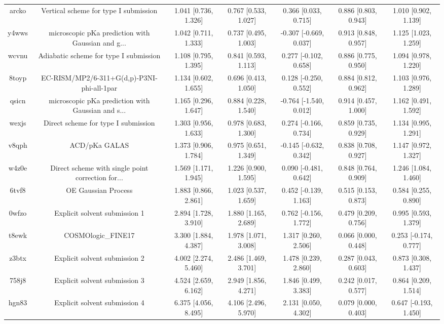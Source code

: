 \documentclass{article}
\begin{document}
\begin{center}
\begin{longtable}{|ccccccc|}
 arcko &              Vertical scheme for type I submission &  1.041 [0.736, 1.326] &  0.767 [0.533, 1.027] &     0.366 [0.033, 0.715] &  0.886 [0.803, 0.943] &   1.010 [0.902, 1.139] \\
 y4wws &  microscopic pKa prediction with Gaussian and g... &  1.042 [0.711, 1.333] &  0.737 [0.495, 1.003] &   -0.307 [-0.669, 0.037] &  0.913 [0.848, 0.957] &   1.125 [1.023, 1.259] \\
 wcvnu &             Adiabatic scheme for type I submission &  1.108 [0.795, 1.395] &  0.841 [0.593, 1.113] &    0.277 [-0.102, 0.658] &  0.886 [0.775, 0.950] &   1.094 [0.978, 1.220] \\
 8toyp &         EC-RISM/MP2/6-311+G(d,p)-P3NI-phi-all-1par &  1.134 [0.602, 1.655] &  0.696 [0.413, 1.050] &    0.128 [-0.250, 0.552] &  0.884 [0.812, 0.962] &   1.103 [0.976, 1.289] \\
 qsicn &  microscopic pKa prediction with Gaussian and s... &  1.165 [0.296, 1.647] &  0.884 [0.228, 1.540] &   -0.764 [-1.540, 0.012] &  0.914 [0.457, 1.000] &   1.162 [0.491, 1.592] \\
 wexjs &                Direct scheme for type I submission &  1.303 [0.956, 1.633] &  0.978 [0.683, 1.300] &    0.274 [-0.166, 0.734] &  0.859 [0.735, 0.929] &   1.134 [0.995, 1.291] \\
 v8qph &                                      ACD/pKa GALAS &  1.373 [0.906, 1.784] &  0.975 [0.651, 1.349] &   -0.145 [-0.632, 0.342] &  0.838 [0.708, 0.927] &   1.147 [0.972, 1.327] \\
 w4z0e &  Direct scheme with single point correction for... &  1.569 [1.171, 1.945] &  1.226 [0.900, 1.595] &    0.090 [-0.481, 0.642] &  0.848 [0.764, 0.909] &   1.246 [1.084, 1.460] \\
 6tvf8 &                                OE Gaussian Process &  1.883 [0.866, 2.861] &  1.023 [0.537, 1.659] &    0.452 [-0.139, 1.163] &  0.515 [0.153, 0.873] &   0.584 [0.255, 0.890] \\
 0wfzo &                      Explicit solvent submission 1 &  2.894 [1.728, 3.910] &  1.880 [1.165, 2.689] &    0.762 [-0.156, 1.772] &  0.479 [0.209, 0.756] &   0.995 [0.593, 1.379] \\
 t8ewk &                                 COSMOlogic\_FINE17 &  3.300 [1.884, 4.387] &  1.978 [1.071, 3.008] &     1.317 [0.260, 2.506] &  0.066 [0.000, 0.448] &  0.253 [-0.174, 0.777] \\
 z3btx &                      Explicit solvent submission 2 &  4.002 [2.274, 5.460] &  2.486 [1.469, 3.701] &     1.478 [0.239, 2.860] &  0.287 [0.043, 0.603] &   0.873 [0.308, 1.437] \\
 758j8 &                      Explicit solvent submission 3 &  4.524 [2.659, 6.162] &  2.949 [1.856, 4.271] &     1.846 [0.499, 3.383] &  0.242 [0.017, 0.577] &   0.864 [0.209, 1.514] \\
 hgn83 &                      Explicit solvent submission 4 &  6.375 [4.056, 8.495] &  4.106 [2.496, 5.970] &     2.131 [0.050, 4.302] &  0.079 [0.000, 0.403] &  0.647 [-0.193, 1.450] \\
\end{longtable}
\end{center}
\end{document}
